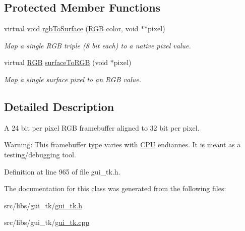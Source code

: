 \subsection*{Protected Member Functions}
\begin{DoxyCompactItemize}
\item 
\hypertarget{classGUI_1_1ScreenRGB32le_ab7657b6a960ab081be4c9adecdaa0750}{virtual void \hyperlink{classGUI_1_1ScreenRGB32le_ab7657b6a960ab081be4c9adecdaa0750}{rgb\-To\-Surface} (\hyperlink{namespaceGUI_aeafd135255365f3584da0e982fc79466}{R\-G\-B} color, void $\ast$$\ast$pixel)}\label{classGUI_1_1ScreenRGB32le_ab7657b6a960ab081be4c9adecdaa0750}

\begin{DoxyCompactList}\small\item\em Map a single R\-G\-B triple (8 bit each) to a native pixel value. \end{DoxyCompactList}\item 
\hypertarget{classGUI_1_1ScreenRGB32le_ad6fbb227845ecca03bf04d344a40dce9}{virtual \hyperlink{namespaceGUI_aeafd135255365f3584da0e982fc79466}{R\-G\-B} \hyperlink{classGUI_1_1ScreenRGB32le_ad6fbb227845ecca03bf04d344a40dce9}{surface\-To\-R\-G\-B} (void $\ast$pixel)}\label{classGUI_1_1ScreenRGB32le_ad6fbb227845ecca03bf04d344a40dce9}

\begin{DoxyCompactList}\small\item\em Map a single surface pixel to an R\-G\-B value. \end{DoxyCompactList}\end{DoxyCompactItemize}


\subsection{Detailed Description}
A 24 bit per pixel R\-G\-B framebuffer aligned to 32 bit per pixel. 

Warning\-: This framebuffer type varies with \hyperlink{classCPU}{C\-P\-U} endiannes. It is meant as a testing/debugging tool. 

Definition at line 965 of file gui\-\_\-tk.\-h.



The documentation for this class was generated from the following files\-:\begin{DoxyCompactItemize}
\item 
src/libs/gui\-\_\-tk/\hyperlink{gui__tk_8h}{gui\-\_\-tk.\-h}\item 
src/libs/gui\-\_\-tk/\hyperlink{gui__tk_8cpp}{gui\-\_\-tk.\-cpp}\end{DoxyCompactItemize}
